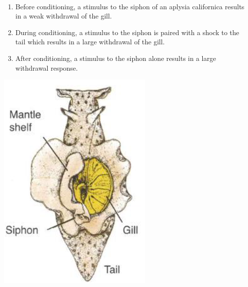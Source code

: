 \begin{example} \phantom{}\\
    \begin{minipage}{0.8\linewidth}
        \begin{enumerate}
            \item Before conditioning, a stimulus to the siphon of an aplysia californica results in a weak withdrawal of the gill.
            \item During conditioning, a stimulus to the siphon is paired with a shock to the tail which results in a large withdrawal of the gill.
            \item After conditioning, a stimulus to the siphon alone results in a large withdrawal response.
        \end{enumerate}
    \end{minipage}
    \begin{minipage}{0.18\linewidth}
        \centering
        \includegraphics[width=\linewidth]{./img/aplysia.png}
    \end{minipage}


\end{example}
